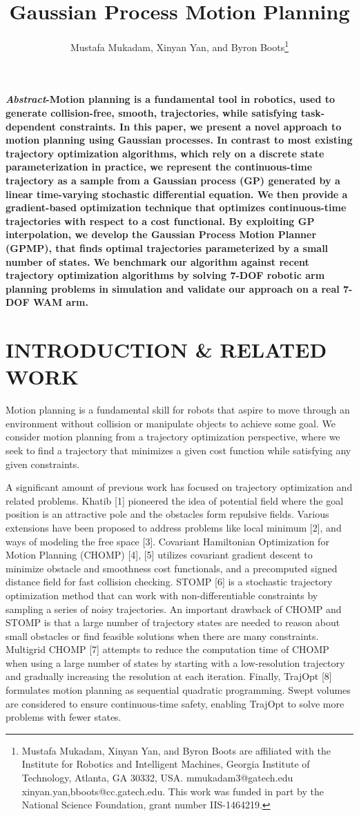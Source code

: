 \documentclass{IEEEtran}
\title{Gaussian Process Motion Planning}
\author{Mustafa Mukadam, Xinyan Yan, and Byron Boots\thanks{Mustafa Mukadam, Xinyan Yan, and Byron Boots are affiliated with
the Institute for Robotics and Intelligent Machines, Georgia Institute
of Technology, Atlanta, GA 30332, USA. mmukadam3@gatech.edu
{xinyan.yan,bboots}@cc.gatech.edu. This work was funded in
part by the National Science Foundation, grant number IIS-1464219.}}
\date{}
\begin{document}
\maketitle
\pagestyle{empty}
\thispagestyle{empty}
\textbf{\emph{Abstract}-Motion planning is a fundamental tool in robotics,
used to generate collision-free, smooth, trajectories, while satisfying task-dependent constraints. In this paper, we present a
novel approach to motion planning using Gaussian processes.
In contrast to most existing trajectory optimization algorithms,
which rely on a discrete state parameterization in practice,
we represent the continuous-time trajectory as a sample from
a Gaussian process (GP) generated by a linear time-varying
stochastic differential equation. We then provide a gradient-based optimization technique that optimizes continuous-time
trajectories with respect to a cost functional. By exploiting GP
interpolation, we develop the Gaussian Process Motion Planner
(GPMP), that finds optimal trajectories parameterized by a
small number of states. We benchmark our algorithm against
recent trajectory optimization algorithms by solving 7-DOF
robotic arm planning problems in simulation and validate our
approach on a real 7-DOF WAM arm.}
\section{INTRODUCTION \& RELATED WORK}
Motion planning is a fundamental skill for robots that
aspire to move through an environment without collision
or manipulate objects to achieve some goal. We consider
motion planning from a trajectory optimization perspective,
where we seek to find a trajectory that minimizes a given
cost function while satisfying any given constraints.

A significant amount of previous work has focused on
trajectory optimization and related problems. Khatib [1]
pioneered the idea of potential field where the goal position is
an attractive pole and the obstacles form repulsive fields. Various extensions have been proposed to address problems like
local minimum [2], and ways of modeling the free space [3].
Covariant Hamiltonian Optimization for Motion Planning
(CHOMP) [4], [5] utilizes covariant gradient descent to minimize obstacle and smoothness cost functionals, and a precomputed signed distance field for fast collision checking.
STOMP [6] is a stochastic trajectory optimization method
that can work with non-differentiable constraints by sampling
a series of noisy trajectories. An important drawback of
CHOMP and STOMP is that a large number of trajectory
states are needed to reason about small obstacles or find
feasible solutions when there are many constraints. Multigrid
CHOMP [7] attempts to reduce the computation time of
CHOMP when using a large number of states by starting
with a low-resolution trajectory and gradually increasing the
resolution at each iteration. Finally, TrajOpt [8] formulates
motion planning as sequential quadratic programming. Swept 
volumes are considered to ensure continuous-time safety,
enabling TrajOpt to solve more problems with fewer states.
\end{document}
